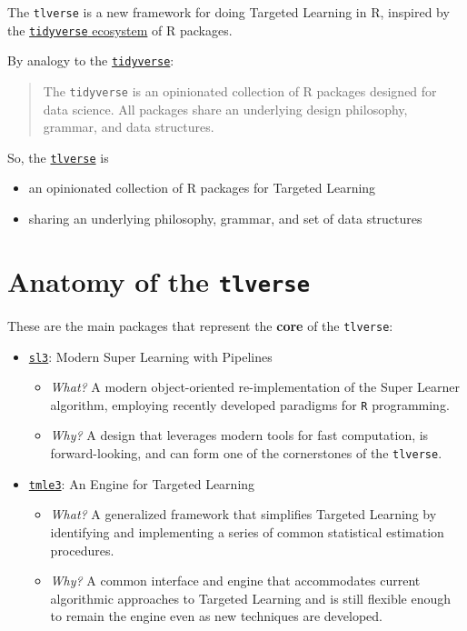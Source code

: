 \documentclass[12pt, krantz2,]{book}
\providecommand{\tightlist}{%
  \setlength{\itemsep}{0pt}\setlength{\parskip}{0pt}}
\theoremstyle{definition}
\theoremstyle{definition}
\theoremstyle{definition}
\newcommand{\1}{\mathbbm{1}}
\begin{document}
The \texttt{tlverse} is a new framework for doing Targeted Learning in R, inspired by
the \href{https://tidyverse.org}{\texttt{tidyverse} ecosystem} of R packages.

By analogy to the \href{https://tidyverse.org/}{\texttt{tidyverse}}:

\begin{quote}
The \texttt{tidyverse} is an opinionated collection of R packages designed for data
science. All packages share an underlying design philosophy, grammar, and data
structures.
\end{quote}

So, the \href{https://tlverse.org}{\texttt{tlverse}} is

\begin{itemize}
\tightlist
\item
  an opinionated collection of R packages for Targeted Learning
\item
  sharing an underlying philosophy, grammar, and set of data structures
\end{itemize}

\hypertarget{anatomy-of-the-tlverse}{%
\section*{\texorpdfstring{Anatomy of the \texttt{tlverse}}{Anatomy of the tlverse}}\label{anatomy-of-the-tlverse}}


These are the main packages that represent the \textbf{core} of the \texttt{tlverse}:

\begin{itemize}
\tightlist
\item
  \href{https://github.com/tlverse/sl3}{\texttt{sl3}}: Modern Super Learning with Pipelines

  \begin{itemize}
  \tightlist
  \item
    \emph{What?} A modern object-oriented re-implementation of the Super Learner
    algorithm, employing recently developed paradigms for \texttt{R} programming.
  \item
    \emph{Why?} A design that leverages modern tools for fast computation, is
    forward-looking, and can form one of the cornerstones of the \texttt{tlverse}.
  \end{itemize}
\item
  \href{https://github.com/tlverse/tmle3}{\texttt{tmle3}}: An Engine for Targeted Learning

  \begin{itemize}
  \tightlist
  \item
    \emph{What?} A generalized framework that simplifies Targeted Learning by
    identifying and implementing a series of common statistical estimation
    procedures.
  \item
    \emph{Why?} A common interface and engine that accommodates current algorithmic
    approaches to Targeted Learning and is still flexible enough to remain the
    engine even as new techniques are developed.
  \end{itemize}
\end{itemize}
\end{document}
